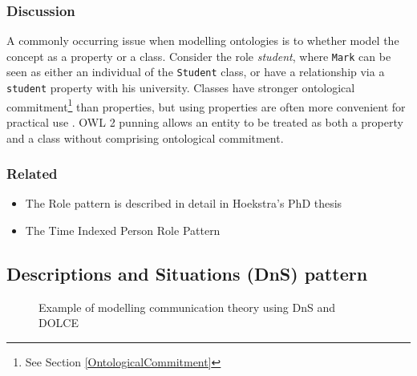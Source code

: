 \subsubsection{Discussion}

A commonly occurring issue when modelling ontologies is to whether model the concept as a property or a class. Consider the role \emph{student}, where \texttt{Mark} can be seen as either an individual of the \texttt{Student} class, or have a relationship via a \texttt{student} property with his university. Classes have stronger ontological commitment\footnote{See Section \ref{OntologicalCommitment}} than properties, but using properties are often more convenient for practical use \cite{Hoekstra2010}. \ac{OWL} 2 punning allows an entity to be treated as both a property and a class without comprising ontological commitment.

\subsubsection{Related}

\begin{itemize}
	\item The Role pattern is described in detail in Hoekstra's PhD thesis \cite{Hoekstra2009}
	\item The Time Indexed Person Role Pattern \cite{Gangemi2008}
\end{itemize}




\subsection{Descriptions and Situations (DnS) pattern}

\begin{figure}[bth]
	\caption{Example of modelling communication theory using \ac{DnS} and \ac{DOLCE}}
	\label{DnSExample}        
\end{figure}

